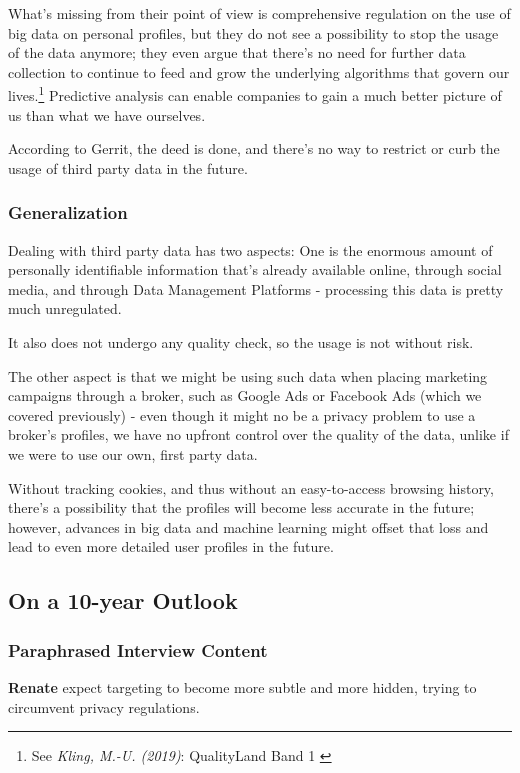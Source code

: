 What's missing from their point of view is comprehensive regulation on the use of big data on personal profiles, but they do not see a possibility to stop the usage of the data anymore; they even argue that there's no need for further data collection to continue to feed and grow the underlying algorithms that govern our lives.\footnote{See \textit{Kling, M.-U. (2019)}: QualityLand Band 1 \cite{qualityLand}} Predictive analysis can enable companies to gain a much better picture of us than what we have ourselves.

According to Gerrit, the deed is done, and there's no way to restrict or curb the usage of third party data in the future.

\subsubsection{Generalization}

Dealing with third party data has two aspects: One is the enormous amount of personally identifiable information that's already available online, through social media, and through Data Management Platforms - processing this data is pretty much unregulated. 

It also does not undergo any quality check, so the usage is not without risk.

The other aspect is that we might be using such data when placing marketing campaigns through a broker, such as Google Ads or Facebook Ads (which we covered previously) - even though it might no be a privacy problem to use a broker's profiles, we have no upfront control over the quality of the data, unlike if we were to use our own, first party data.

Without tracking cookies, and thus without an easy-to-access browsing history, there's a possibility that the profiles will become less accurate in the future; however, advances in big data and machine learning might offset that loss and lead to even more detailed user profiles in the future.

\subsection{On a 10-year Outlook}

\subsubsection{Paraphrased Interview Content}

\textbf{Renate} expect targeting to become more subtle and more hidden, trying to circumvent privacy regulations.

